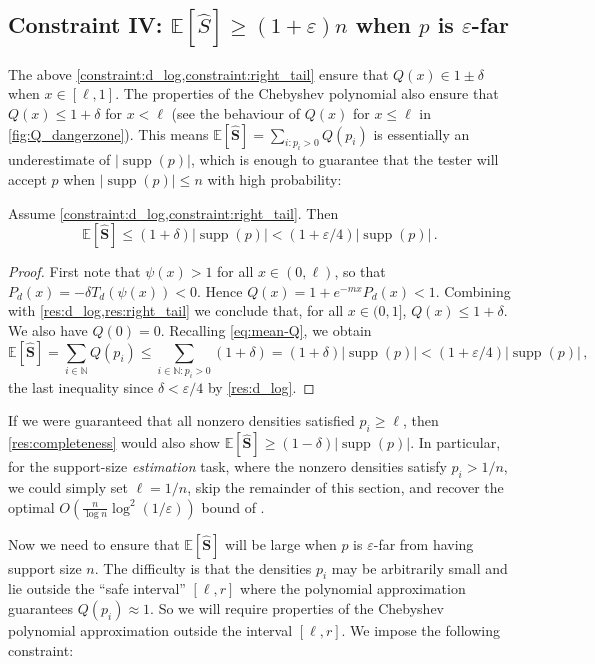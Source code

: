 \documentclass{theoretics}
\DeclareMathOperator{\supp}{supp}   %
\newcommand{\Ex}[1]{\bE \left[ #1 \right]}
\newcommand{\bE}{\ensuremath{\mathbb{E}}}
\newcommand{\bN}{\ensuremath{\mathbb{N}}}
\renewcommand{\epsilon}{\varepsilon}
\begin{document}
\subsection{Constraint IV: \texorpdfstring{$\mathbb{E}[\widehat{S}] \geq (1+\epsilon)n$ when $p$ is $\epsilon$-far}{expectation of S hat large when p is epsilon-far}}
\label{section:means}

The above \cref{constraint:d_log,constraint:right_tail} ensure that $Q(x) \in 1 \pm \delta$ when $x
\in [\ell, 1]$. The properties of the Chebyshev polynomial also ensure that $Q(x) \leq 1+\delta$ for
$x < \ell$ (see the behaviour of $Q(x)$ for $x \leq \ell$ in \cref{fig:Q_dangerzone}). This means
$\Ex{\widehat{\bm S}} = \sum_{i : p_i > 0} Q(p_i)$ is essentially an underestimate of $|\supp(p)|$, which is
enough to guarantee that the tester will accept $p$ when $|\supp(p)| \leq n$ with high
probability:
\begin{lemma}
  \label{res:completeness}
  Assume \cref{constraint:d_log,constraint:right_tail}. Then
  \[
      \Ex{\bm{\widehat S}} \le (1 + \delta) |\supp(p)|
      < (1 + \epsilon/4) |\supp(p)| \,.
  \]
\end{lemma}
\begin{proof}
  First note that $\psi(x) > 1$ for all $x \in (0, \ell)$, so that $P_d(x) = -\delta
  T_d(\psi(x)) < 0$. Hence $Q(x) = 1 + e^{-mx} P_d(x) < 1$. Combining with
  \cref{res:d_log,res:right_tail} we conclude that, for all $x \in (0, 1]$, $Q(x) \le 1 + \delta$.
  We also have $Q(0) = 0$. Recalling \eqref{eq:mean-Q}, we obtain
  \[
      \Ex{\bm{\widehat S}}
      = \sum_{i \in \bN} Q(p_i)
      \le \sum_{i \in \bN : p_i > 0} (1 + \delta)
      = (1 + \delta) |\supp(p)|
      < (1 + \epsilon/4) |\supp(p)| \,,
  \]
  the last inequality since $\delta < \epsilon/4$ by \cref{res:d_log}.
\end{proof}

\begin{remark}
\label{remark:recover-wy}
If we were guaranteed that all nonzero densities satisfied $p_i \geq \ell$, then
\cref{res:completeness} would also show $\Ex{\widehat{\bm S}} \geq (1-\delta)|\supp(p)|$. In
particular, for the support-size \emph{estimation} task, where the nonzero densities satisfy $p_i >
1/n$, we could simply set $\ell = 1/n$, skip the remainder of this section, and recover the optimal
$O\left(\frac{n}{\log n} \log^2(1/\epsilon)\right)$ bound of \cite{WY19}. 
\end{remark}
Now we need to ensure that $\Ex{\widehat{\bm S}}$ will be large when $p$ is $\epsilon$-far from
having support size $n$. The difficulty is that the densities $p_i$ may be arbitrarily small and lie
outside the ``safe interval'' $[\ell,r]$ where the polynomial approximation guarantees $Q(p_i)
\approx 1$. So we will require properties of the Chebyshev polynomial approximation outside the
interval $[\ell, r]$. We impose the following constraint:
\end{document}
